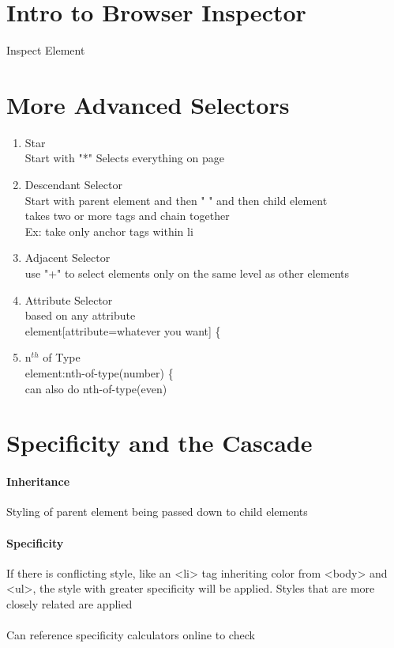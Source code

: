 \documentclass{article}
\begin{document}
\section{Intro to Browser Inspector}
Inspect Element

\section{More Advanced Selectors}
\begin{enumerate}
	\item Star
	\\Start with "*" Selects everything on page
	\item Descendant Selector
	\\ Start with parent element and then " " and then child element
	\\takes two or more tags and chain together
	\\ Ex: take only anchor tags within li
	\item Adjacent Selector
	\\use "+" to select elements only on the same level as other elements
	\item Attribute Selector
	\\based on any attribute
	\\element[attribute=whatever you want] \{
	\item n$^{th}$ of Type
	\\element:nth-of-type(number) \{
	\\can also do nth-of-type(even)
\end{enumerate}

\section{Specificity and the Cascade}
	\paragraph*{Inheritance} Styling of parent element being passed down to child elements
	\paragraph*{Specificity} If there is conflicting style, like an <li> tag inheriting color from <body> and <ul>, the style with greater specificity will be applied. Styles that are more closely related are applied
	\\\\Can reference specificity calculators online to check
	
\end{document}
